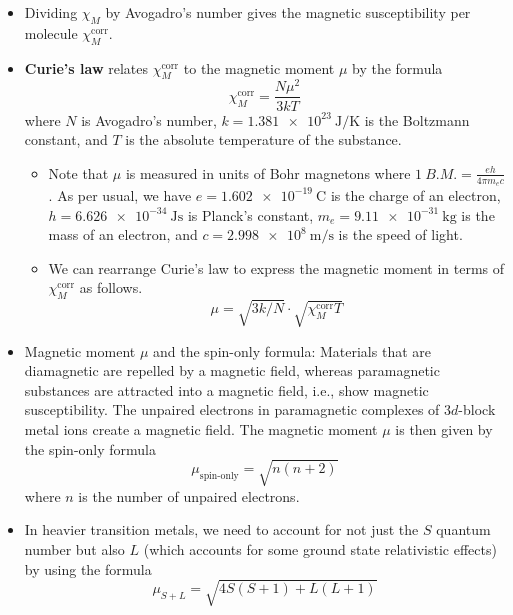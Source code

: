 \documentclass[../notes.tex]{subfiles}
\begin{document}
\begin{itemize}
\begin{itemize}
        \item Dividing $\chi_M$ by Avogadro's number gives the magnetic susceptibility per molecule $\chi_M^\text{corr}$.
        \item \textbf{Curie's law} relates $\chi_M^\text{corr}$ to the magnetic moment $\mu$ by the formula
        \begin{equation*}
            \chi_M^\text{corr} = \frac{N\mu^2}{3kT}
        \end{equation*}
        where $N$ is Avogadro's number, $k=\SI[per-mode=symbol]{1.381e23}{\joule\per\kelvin}$ is the Boltzmann constant, and $T$ is the absolute temperature of the substance.
        \begin{itemize}
            \item Note that $\mu$ is measured in units of Bohr magnetons where $\SI{1}{B.M.}=\frac{eh}{4\pi m_ec}$. As per usual, we have $e=\SI{1.602e-19}{\coulomb}$ is the charge of an electron, $h=\SI{6.626e-34}{\joule\second}$ is Planck's constant, $m_e=\SI{9.11e-31}{\kilo\gram}$ is the mass of an electron, and $c=\SI[per-mode=symbol]{2.998e8}{\meter\per\second}$ is the speed of light.
            \item We can rearrange Curie's law to express the magnetic moment in terms of $\chi_M^\text{corr}$ as follows.
            \begin{equation*}
                \mu = \sqrt{3k/N}\cdot\sqrt{\chi_M^\text{corr}T}
            \end{equation*}
        \end{itemize}
        \item Magnetic moment $\mu$ and the spin-only formula: Materials that are diamagnetic are repelled by a magnetic field, whereas paramagnetic substances are attracted into a magnetic field, i.e., show magnetic susceptibility. The unpaired electrons in paramagnetic complexes of $3d$-block metal ions create a magnetic field. The magnetic moment $\mu$ is then given by the spin-only formula
        \begin{equation*}
            \mu_\text{spin-only} = \sqrt{n(n+2)}
        \end{equation*}
        where $n$ is the number of unpaired electrons.
        \item In heavier transition metals, we need to account for not just the $S$ quantum number but also $L$ (which accounts for some ground state relativistic effects) by using the formula
        \begin{equation*}
            \mu_{S+L} = \sqrt{4S(S+1)+L(L+1)}
        \end{equation*}
    \end{itemize}
\end{itemize}
\end{document}
